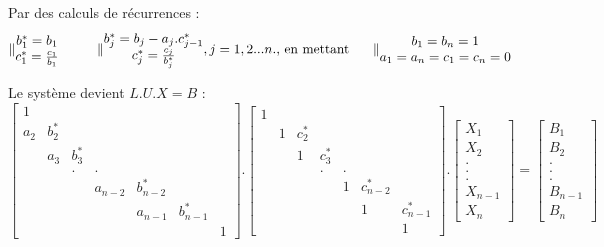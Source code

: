 \documentclass{book}
\begin{document}
Par des calculs de récurrences : \\
\[
\|
	\begin{matrix}
		b_{1}^{*}=b_{1}\\
		c_{1}^{*}=\frac{c_{1}}{b_{1}}
	\end{matrix} \hbox{\hspace{1cm}}
\|
	\begin{matrix}
		b_{j}^{*}=b_{j}-a_{j}.c_{j-1}^{*}\\
		c_{j}^{*}=\frac{c_{j}}{b_{j}^{*}}
	\end{matrix} ,j=1,2...n. \hbox{, en mettant \hspace{0.5cm}}
\|
	\begin{matrix}
		b_{1}=b_{n}=1\\
		a_{1}=a_{n}=c_{1}=c_{n}=0 
	\end{matrix} 
\]

Le système devient $L.U.X=B$ : 
\begin{equation}
\left[\begin{array}{ccccccc}
1\\
a_{2} & b_{2}^{*}  \\
 & a_{3} & b_{3}^{*}  \\
 &  & . & .\\
 &  &  & a_{n-2} & b_{n-2}^{*} \\
 &  &  &  & a_{n-1} & b_{n-1}^{*} \\
 &  &  &  &  &  & 1\end{array}\right].
\left[\begin{array}{ccccccc}
1\\
& 1 & c_{2}^{*}\\
& & 1 & c_{3}^{*}\\
& &  & .  & .\\
& &  &  &  1 & c_{n-2}^{*}\\
& &  &  &  &  1 & c_{n-1}^{*}\\
&  &  &  &  &  & 1\end{array}\right].\left[\begin{array}{c}
X_{1}\\
X_{2}\\
.\\
.\\
.\\
X_{n-1}\\
X_{n}\end{array}\right]=\left[\begin{array}{c}
B_{1}\\
B_{2}\\
.\\
.\\
.\\
B_{n-1}\\
B_{n}\end{array}\right]
\end{equation}
\end{document}
